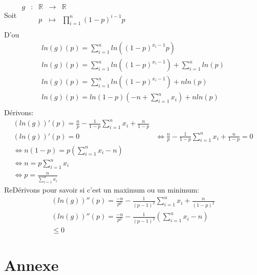 \documentclass[12pt]{report}
\newcommand{\R}{\mathbb{R}}
\newcommand{\fct}[5]
	{
	  \begin{array}{ccccc}
		#1 & : & #2 & \to & #3 \\
	    && #4 & \mapsto & #5 \\
	  \end{array}
	}
\begin{document}
Soit $\fct{g}{\R}{\R}{p}{\prod_{i=1}^n (1-p)^{i-1}p}$\\
D'ou 
\begin{align*}
    ln(g)(p) = \sum_{i=1}^n ln((1-p)^{x_i-1}p)\\
    ln(g)(p) = \sum_{i=1}^n ln((1-p)^{x_i-1}) + \sum_{i=1}^n ln(p)\\
    ln(g)(p) = \sum_{i=1}^{n} ln((1-p)^{x_i-1}) + nln(p)\\
    ln(g)(p) = ln(1-p)(-n + \sum_{i=1}^{n} x_i)  + nln(p)\\
\end{align*}
Dérivons:
\begin{align*}
    (ln(g))'(p) = \frac{n}{p} - \frac{1}{1-p}\sum_{i=1}^{n} x_i + \frac{n}{1-p}\\
    (ln(g))'(p) = 0 &\Leftrightarrow \frac{n}{p} - \frac{1}{1-p}\sum_{i=1}^{n} x_i + \frac{n}{1-p} =0\\
    \Leftrightarrow n(1-p) = p (\sum_{i=1}^{n} x_i  - n)\\
    \Leftrightarrow n = p \sum_{i=1}^n x_i\\
    \Leftrightarrow p = \frac{n}{\sum_{i=1}^n x_i}
\end{align*}
ReDérivons pour savoir si c'est un maximum ou un minimum:\\
\begin{align*}
    (ln(g))''(p) = \frac{-n}{p^2} - \frac{1}{(p-1)^2}\sum_{i=1}^n x_i  + \frac{n}{(1-p)^2}\\
    (ln(g))''(p) = \frac{-n}{p^2} - \frac{1}{(p-1)^2}(\sum_{i=1}^n x_i   -n)\\
    \leq 0
\end{align*}
\chapter*{Annexe}
\end{document}
